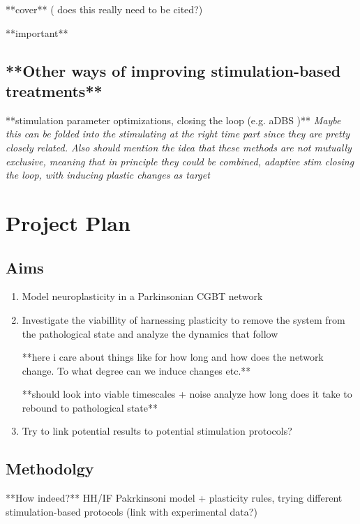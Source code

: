 **cover** \cite{jansen1995electroencephalogram} (\cite{hodgkin1952measurement} does this really need to be cited?)

**important** \cite{terman2002activity} \cite{rubin2004high} \cite{rubin2012basal} \\
\cite{duchet2023mean} \cite{shupe2021integrate} \cite{schwab2020spike}

\subsection{**Other ways of improving stimulation-based treatments**}
**stimulation parameter optimizations, closing the loop (e.g. aDBS \cite{beudel2018adaptive})**
\textit{
	Maybe this can be folded into the stimulating at the right time part
	since they are pretty closely related. Also should mention the idea that
	these methods are not mutually exclusive, meaning that in principle they
	could be combined, adaptive stim closing the loop, with inducing plastic
	changes as target
}

\section{Project Plan}


\subsection{Aims}
\begin{enumerate}
	\item Model neuroplasticity in a Parkinsonian CGBT network
	\item Investigate the viabillity of harnessing plasticity to remove the
	      system from the pathological state and analyze the dynamics that follow

	      **here i care about things like for how long and how does the network change.
	      To what degree can we induce changes etc.**

	      **should look into viable timescales + noise analyze how long does it take to rebound to
	      pathological state**
	\item Try to link potential results to potential stimulation protocols?
\end{enumerate}

\subsection{Methodolgy} **How indeed?** HH/IF Pakrkinsoni model + plasticity rules, trying
different stimulation-based protocols (link with experimental data?)

